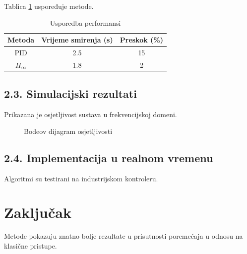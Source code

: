 \documentclass[12pt,a4paper]{article}
\begin{document}
Tablica \ref{tab:usporedba} uspoređuje metode.
\begin{table}[h]
    \centering
    \caption{Usporedba performansi}
    \label{tab:usporedba}
    \begin{tabular}{|c|c|c|}
        \hline
        \textbf{Metoda} & \textbf{Vrijeme smirenja (s)} & \textbf{Preskok (\%)} \\ \hline
        PID & 2.5 & 15 \\ \hline
        $H_\infty$ & 1.8 & 2 \\ \hline
    \end{tabular}
\end{table}

\subsection{2.3. Simulacijski rezultati}
Prikazana je osjetljivost sustava u frekvencijskoj domeni.
\begin{figure}[h]
    \centering
    \caption{Bodeov dijagram osjetljivosti}
\end{figure}

\subsection{2.4. Implementacija u realnom vremenu}
Algoritmi su testirani na industrijskom kontroleru.

\section{Zaključak}
Metode pokazuju znatno bolje rezultate u prisutnosti poremećaja u odnosu na klasične pristupe.
\end{document}
